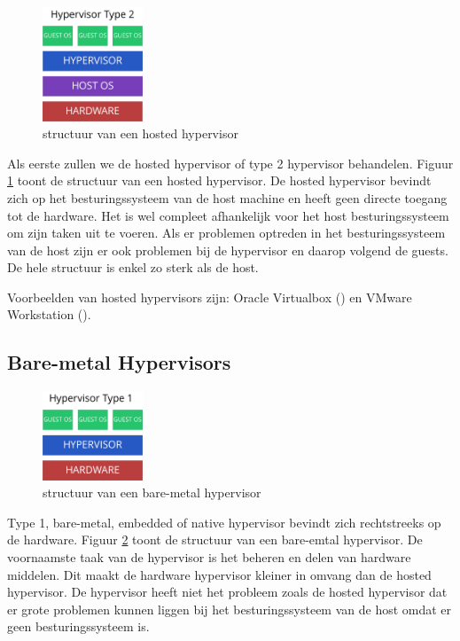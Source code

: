 \documentclass[pdftex,a4paper,12pt,twoside]{report}
\begin{document}
\begin{figure}
    \centering
    \includegraphics[width=3cm]{img/hypervisor-2}
    \caption{structuur van een hosted hypervisor}
    \label{fig:hypervisor-2}
\end{figure}


Als eerste zullen we de hosted hypervisor of type 2 hypervisor behandelen. Figuur \ref{fig:hypervisor-2} toont de structuur van een hosted hypervisor. De hosted hypervisor bevindt zich op het besturingssysteem van de host machine en heeft geen directe toegang tot de hardware. Het is wel compleet afhankelijk voor het host besturingssysteem om zijn taken uit te voeren. Als er problemen optreden in het besturingssysteem van de host zijn er ook problemen bij de hypervisor en daarop volgend de guests. De hele structuur is enkel zo sterk als de host.

Voorbeelden van hosted hypervisors zijn: Oracle Virtualbox (\cite{Oracle2016}) en VMware Workstation (\cite{VMware2016}).

\subsection{Bare-metal Hypervisors}

\begin{figure}
    \centering
    \includegraphics[width=3cm]{img/hypervisor-1}
    \caption{structuur van een bare-metal hypervisor}
    \label{fig:hypervisor-1}
\end{figure}

Type 1, bare-metal, embedded of native hypervisor bevindt zich rechtstreeks op de hardware. Figuur \ref{fig:hypervisor-1} toont de structuur van een bare-emtal hypervisor. De voornaamste taak van de hypervisor is het beheren en delen van hardware middelen. Dit maakt de hardware hypervisor kleiner in omvang dan de hosted hypervisor. De hypervisor heeft niet het probleem zoals de hosted hypervisor dat er grote problemen kunnen liggen bij het besturingssysteem van de host omdat er geen besturingssysteem is.
\end{document}

